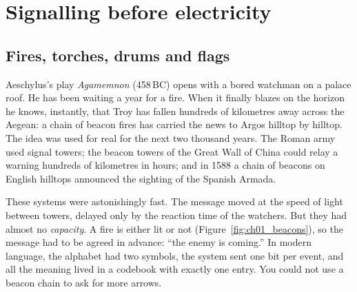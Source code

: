 
\section{Signalling before electricity}
\label{sec:ch01:preelectric}

\subsection{Fires, torches, drums and flags}

Aeschylus's play \emph{Agamemnon} (458\,BC) opens with a bored watchman on a palace roof. He has
been waiting a year for a fire. When it finally blazes on the horizon he knows, instantly, that Troy
has fallen hundreds of kilometres away across the Aegean: a chain of beacon fires has carried the
news to Argos hilltop by hilltop. The idea was used for real for the next two thousand years. The
Roman army used signal towers; the beacon towers of the Great Wall of China could relay a warning
hundreds of kilometres in hours; and in 1588 a chain of beacons on English hilltops announced the
sighting of the Spanish Armada.


These systems were astonishingly fast. The message moved at the speed of light between towers,
delayed only by the reaction time of the watchers. But they had almost no \emph{capacity}. A fire is
either lit or not (Figure~\ref{fig:ch01_beacons}), so the message had to be agreed in advance: ``the
enemy is coming.'' In modern language, the alphabet had two symbols, the system sent one bit per
event, and all the meaning lived in a codebook with exactly one entry. You could not use a beacon
chain to ask for more arrows.

